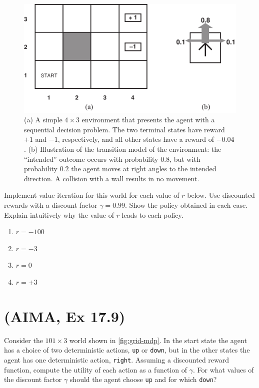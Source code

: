 \documentclass[11pt, a4paper]{article}
\begin{document}
\begin{figure}[h]
    \centering
    \includegraphics{figures/e6_sequential.pdf}
    \caption{(a) A simple $4\times 3$ environment that presents the agent with a sequential decision problem. The two terminal states have reward $+1$ and $-1$, respectively, and all other states have a reward of $-0.04$. (b) Illustration of the transition model of the environment: the \enquote{intended} outcome occurs with probability $0.8$, but with probability $0.2$ the agent moves at right angles to the intended direction. A collision with a wall results in no movement.}
    \label{fig:sequential}
\end{figure}

Implement value iteration for this world for each value of $r$ below. Use discounted rewards with a discount factor $\gamma = \num{0.99}$. Show
the policy obtained in each case. Explain intuitively why the value of $r$ leads to each policy.

\begin{enumerate}
    \item $r = -100$
    \item $r = -3$
    \item $r = 0$
    \item $r = +3$
\end{enumerate}

\newpage

\section{(AIMA, Ex 17.9)} \label{sec:17.9}

Consider the $101 \times 3$ world shown in \ref{fig:grid-mdp}. In the start state the agent has a choice of two deterministic actions, \texttt{up} or \texttt{down}, but in the other states the agent has one deterministic action, \texttt{right}. Assuming a discounted
reward function, compute the utility of each action as a function of $\gamma$. For what values of the discount factor $\gamma$ should the agent choose \texttt{up} and for which \texttt{down}?
\end{document}
